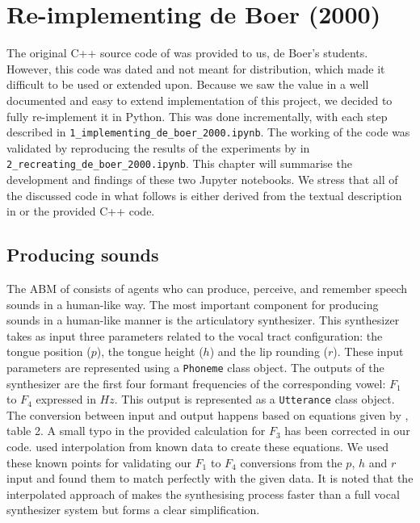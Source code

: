 \chapter{Re-implementing de Boer (2000)}
\label{ch:reimplementing}

The original C++ source code of \citet{deBoer2000} was provided to us, de Boer's students.
However, this code was dated and not meant for distribution, which made it difficult to be used or extended upon.
Because we saw the value in a well documented and easy to extend implementation of this project, we decided to fully re-implement it in Python.
This was done incrementally, with each step described in \texttt{1\_implementing\_de\_boer\_2000.ipynb}.
The working of the code was validated by reproducing the results of the experiments by \citet{deBoer2000} in \texttt{2\_recreating\_de\_boer\_2000.ipynb}.
This chapter will summarise the development and findings of these two Jupyter notebooks.
We stress that all of the discussed code in what follows is either derived from the textual description in \citet{deBoer2000} or the provided C++ code.


\section{Producing sounds}
\label{sec:reimplementing_producing}

The ABM of \citet{deBoer2000} consists of agents who can produce, perceive, and remember speech sounds in a human-like way.
The most important component for producing sounds in a human-like manner is the articulatory synthesizer.
This synthesizer takes as input three parameters related to the vocal tract configuration: the tongue position ($p$), the tongue height ($h$) and the lip rounding ($r$).
These input parameters are represented using a \texttt{Phoneme} class object.
The outputs of the synthesizer are the first four formant frequencies of the corresponding vowel: $F_1$ to $F_4$ expressed in $Hz$.
This output is represented as a \texttt{Utterance} class object.
The conversion between input and output happens based on equations given by \citet{deBoer2000}, table 2.
A small typo in the provided calculation for $F_3$ has been corrected in our code.
 used interpolation from known data to create these equations.
We used these known points for validating our $F_1$ to $F_4$ conversions from the $p$, $h$ and $r$ input and found them to match perfectly with the given data.
It is noted that the interpolated approach of \citet{deBoer2000} makes the synthesising process faster than a full vocal synthesizer system but forms a clear simplification.

